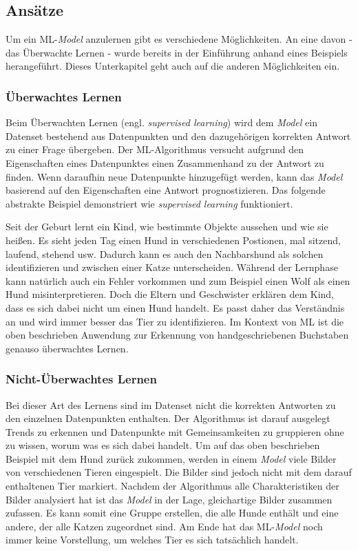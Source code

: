 \subsection{Ansätze}
\label{sec:ml_types}

Um ein ML-\textit{Model} anzulernen gibt es verschiedene Möglichkeiten. An eine davon - das Überwachte Lernen - wurde bereits in der Einführung anhand eines Beispiels herangeführt. Dieses Unterkapitel geht auch auf die anderen Möglichkeiten ein.

\subsubsection{Überwachtes Lernen}
Beim Überwachten Lernen (engl. \textit{supervised learning}) wird dem \textit{Model} ein Datenset bestehend aus Datenpunkten und den dazugehörigen korrekten Antwort zu einer Frage übergeben. Der ML-Algorithmus versucht aufgrund den Eigenschaften eines Datenpunktes einen Zusammenhand zu der Antwort zu finden. Wenn daraufhin neue Datenpunkte hinzugefügt werden, kann das \textit{Model} basierend auf den Eigenschaften eine Antwort prognostizieren. Das folgende abstrakte Beispiel demonstriert wie \textit{supervised learning} funktioniert.

Seit der Geburt lernt ein Kind, wie bestimmte Objekte aussehen und wie sie heißen. Es sieht jeden Tag einen Hund in verschiedenen Postionen, mal sitzend, laufend, stehend usw. Dadurch kann es auch den Nachbarshund als solchen identifizieren und zwischen einer Katze unterscheiden. Während der Lernphase kann natürlich auch ein Fehler vorkommen und zum Beispiel einen Wolf als einen Hund misinterpretieren. Doch die Eltern und Geschwister erklären dem Kind, dass es sich dabei nicht um einen Hund handelt. Es passt daher das Verständnis an und wird immer besser das Tier zu identifizieren. Im Kontext von ML ist die oben beschrieben Anwendung zur Erkennung von handgeschriebenen Buchstaben genauso überwachtes Lernen.

\subsubsection{Nicht-Überwachtes Lernen}
Bei dieser Art des Lernens sind im Datenset nicht die korrekten Antworten zu den einzelnen Datenpunkten enthalten. Der Algorithmus ist darauf ausgelegt Trends zu erkennen und Datenpunkte mit Gemeinsamkeiten zu gruppieren ohne zu wissen, worum was es sich dabei handelt. Um auf das oben beschrieben Beispiel mit dem Hund zurück zukommen, werden in einem \textit{Model} viele Bilder von verschiedenen Tieren eingespielt. Die Bilder sind jedoch nicht mit dem darauf enthaltenen Tier markiert. Nachdem der Algorithmus alle Charakteristiken der Bilder analysiert hat ist das \textit{Model} in der Lage, gleichartige Bilder zusammen zufassen. Es kann somit eine Gruppe erstellen, die alle Hunde enthält und eine andere, der alle Katzen zugeordnet sind. Am Ende hat das ML-\textit{Model} noch immer keine Vorstellung, um welches Tier es sich tatsächlich handelt.

